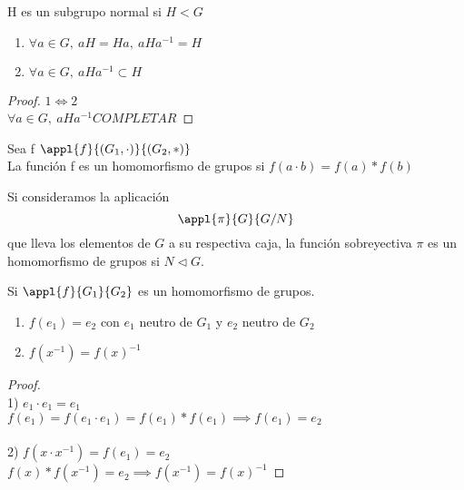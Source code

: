 \documentclass[a4paper,10pt]{apuntes}
\begin{document}
 
 \begin{theorem}
 H es un subgrupo normal si $H<G$\\
 \begin{enumerate}
 \item $\forall a \in G,\ aH = Ha,\ aHa^{-1}=H$
 \item $\forall a \in G,\ aHa^{-1} \subset H$
 \end{enumerate}
 \end{theorem}
 \begin{proof}
 $1 \iff 2$\\
 $\forall a\in G,\ aHa^{-1} COMPLETAR$
 \end{proof}
 
 \begin{defn}
 Sea f $\appl{f}{(G_1, \cdot )}{(G_2, \ast )}$\\
 La función f es un homomorfismo de grupos si 
 $f(a\cdot b) = f(a)\ast f(b)$
 \end{defn}
 
 \begin{example}
 Si consideramos la aplicación $$\appl{\pi}{G}{G/N}$$ que lleva
 los elementos de $G$ a su respectiva caja, la función sobreyectiva $\pi$ es 
 un homomorfismo de grupos si $N\lhd G$.
 \end{example}
 
 \begin{props} 
 Si $\appl{f}{G_1}{G_2}$ es un homomorfismo de grupos.
 \begin{enumerate}
 \item $f(e_1) = e_2$ con $e_1$ neutro de $G_1$ y $e_2$ neutro de $G_2$
 \item $f(x^{-1}) = f(x)^{-1}$
 \end{enumerate}
 \end{props}
 
 \begin{proof} \\
 1) $e_1\cdot e_1 = e_1$\\ 
 $f(e_1)=f(e_1\cdot e_1) = f(e_1)\ast f(e_1) \implies f(e_1) = e_2$\\
 \\
 2) $f(x\cdot x^{-1}) = f(e_1) = e_2$\\ 
 $f(x)\ast f(x^{-1}) = e_2 \implies f(x^{-1}) = f(x)^{-1}$
 
 \end{proof}
 
\end{document}
